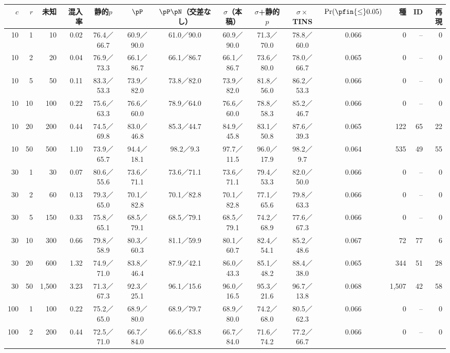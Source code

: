 {\fontsize{6.0pt}{7.1pt}\selectfont\renewcommand{\arraystretch}{1.0}%
\setlength{\tabcolsep}{1.4pt}\begin{tabular}{@{}rrrr|cccccc|c|rrr@{}}
\hline
\rule[-2.0pt]{0pt}{8.2pt}$c$ & $r$ & 未知 & 混入率 & 静的$p$ & $\pP$ & $\pP\pN$（交差なし） & $\sigma$（本稿） & $\sigma$+静的$p$ & $\sigma\times$TINS & $\Pr(\pfin{\le}0.05)$ & 種 & ID & 再現 \\
\hline
10 & 1 & 10 & 0.02 & 76.4／66.7 & 60.9／90.0 & 61.0／90.0 & 60.9／90.0 & 71.3／70.0 & 78.8／60.0 & 0.066 & 0 & -- & 0 \\
10 & 2 & 20 & 0.04 & 76.9／73.3 & 66.1／86.7 & 66.1／86.7 & 66.1／86.7 & 73.6／80.0 & 78.0／66.7 & 0.065 & 0 & -- & 0 \\
10 & 5 & 50 & 0.11 & 83.3／53.3 & 73.9／82.0 & 73.8／82.0 & 73.9／82.0 & 81.8／56.0 & 86.2／53.3 & 0.066 & 0 & -- & 0 \\
10 & 10 & 100 & 0.22 & 75.6／63.3 & 76.6／60.0 & 78.9／64.0 & 76.6／60.0 & 78.8／58.3 & 85.2／46.7 & 0.066 & 0 & -- & 0 \\
10 & 20 & 200 & 0.44 & 74.5／69.8 & 83.0／46.8 & 85.3／44.7 & 84.9／45.8 & 83.1／50.8 & 87.6／39.3 & 0.065 & 122 & 65 & 22 \\
10 & 50 & 500 & 1.10 & 73.9／65.7 & 94.4／18.1 & 98.2／9.3 & 97.7／11.5 & 96.0／17.9 & 98.2／9.7 & 0.064 & 535 & 49 & 55 \\
30 & 1 & 30 & 0.07 & 80.6／55.6 & 73.6／71.1 & 73.6／71.1 & 73.6／71.1 & 79.4／53.3 & 82.0／50.0 & 0.066 & 0 & -- & 0 \\
30 & 2 & 60 & 0.13 & 79.3／65.0 & 70.1／82.8 & 70.1／82.8 & 70.1／82.8 & 77.1／65.6 & 79.8／63.3 & 0.066 & 0 & -- & 0 \\
30 & 5 & 150 & 0.33 & 75.8／65.1 & 68.5／79.1 & 68.5／79.1 & 68.5／79.1 & 74.2／68.9 & 77.6／67.3 & 0.066 & 0 & -- & 0 \\
30 & 10 & 300 & 0.66 & 79.8／58.9 & 80.3／60.3 & 81.1／59.9 & 80.1／60.7 & 82.4／54.1 & 85.2／48.6 & 0.067 & 72 & 77 & 6 \\
30 & 20 & 600 & 1.32 & 74.9／71.0 & 83.8／46.4 & 87.9／42.1 & 86.0／43.3 & 85.1／48.2 & 88.4／38.0 & 0.065 & 344 & 51 & 28 \\
30 & 50 & 1,500 & 3.23 & 71.3／67.3 & 92.3／25.1 & 96.1／15.6 & 96.0／16.5 & 95.3／21.6 & 96.7／13.8 & 0.068 & 1,507 & 42 & 58 \\
100 & 1 & 100 & 0.22 & 75.2／65.0 & 68.9／80.0 & 68.9／79.7 & 68.9／80.0 & 74.2／68.0 & 80.5／62.3 & 0.066 & 0 & -- & 0 \\
100 & 2 & 200 & 0.44 & 72.5／71.0 & 66.7／84.0 & 66.6／83.8 & 66.7／84.0 & 71.6／74.2 & 77.2／66.7 & 0.066 & 0 & -- & 0 \\

\end{tabular}}
